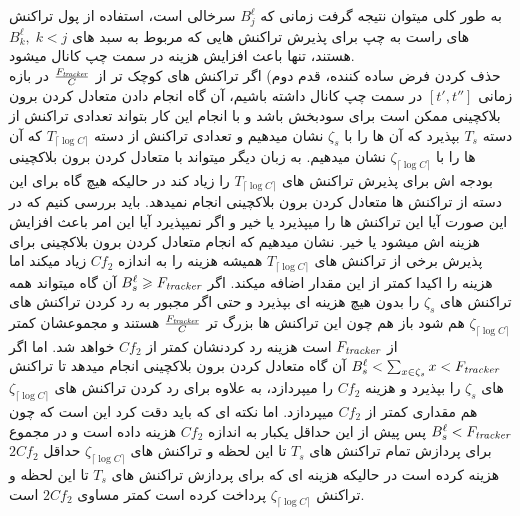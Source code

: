 به طور کلی میتوان نتیجه گرفت زمانی که \bucket
$B_{j}^{\ell}$
سرخالی است، استفاده از پول تراکنش های راست به چپ برای پذیرش تراکنش هایی که مربوط به سبد های
$B_{k}^{\ell}, \;k < j $
هستند، تنها باعث افزایش هزینه \off در سمت چپ کانال میشود. \\
حذف کردن فرض ساده کننده، قدم دوم) اگر تراکنش های کوچک تر از
$\frac{F_{\textit{tracker}}}{C}$
در بازه زمانی
$[t',t'']$
در سمت چپ کانال داشته باشیم، آن گاه انجام دادن متعادل کردن برون بلاکچینی ممکن است برای \off سودبخش باشد و با انجام این کار بتواند تعدادی تراکنش از دسته
$T_s$
بپذیرد که آن ها را با 
$\zeta_{s}$
نشان میدهیم و تعدادی تراکنش از دسته
$T_{\lceil\log{C}\rceil}$
که آن ها را با
$\zeta_{\lceil\log{C}\rceil}$
نشان میدهیم.
به زبان دیگر \off میتواند با متعادل کردن برون بلاکچینی بودجه اش برای پذیرش تراکنش های 
$T_{\lceil\log{C}\rceil}$
را زیاد کند در حالیکه \on هیچ گاه برای این دسته از تراکنش ها متعادل کردن برون بلاکچینی انجام نمیدهد.
باید بررسی کنیم که در این صورت \on آیا این تراکنش ها را میپذیرد یا خیر و اگر نمیپذیرد آیا این امر باعث افزایش هزینه اش میشود یا خیر. نشان میدهیم که انجام متعادل کردن برون بلاکچینی برای پذیرش برخی از تراکنش های 
$T_{\lceil\log{C}\rceil}$
همیشه هزینه \off را  به اندازه
$Cf_2$
زیاد میکند اما هزینه \on را اکیدا کمتر از این مقدار اضافه میکند. اگر
$B_s^{\ell} \geqslant F_{\textit{tracker}}$
آن گاه \on میتواند همه تراکنش های 
$\zeta_{s}$
را بدون هیچ هزینه ای بپذیرد و حتی اگر مجبور به رد کردن تراکنش های 
$\zeta_{\lceil\log{C}\rceil}$
هم شود باز هم چون این تراکنش ها بزرگ تر 
$\frac{F_{\textit{tracker}}}{C}$
هستند و مجموعشان کمتر از
$F_{\textit{tracker}}$
است هزینه رد کردنشان کمتر از
$Cf_2$
خواهد شد.
اما اگر 
$B_s^{\ell} < \sum_{x \in \zeta_{s}} x < F_{\textit{tracker}}$
آن گاه \on متعادل کردن برون بلاکچینی انجام میدهد تا تراکنش های
$\zeta_{s}$
را بپذیرد و هزینه
$Cf_2$
را میپردازد، به علاوه برای رد کردن تراکنش های 
$\zeta_{\lceil\log{C}\rceil}$
هم مقداری کمتر از 
$Cf_2$
میپردازد.
اما نکته ای که باید دقت کرد این است که چون 
$B_s^{\ell} < F_{\textit{tracker}}$
پس پیش از این \off حداقل یکبار به اندازه 
$Cf_2$
هزینه داده است و در مجموع برای پردازش تمام تراکنش های 
$T_s$
تا این لحظه و تراکنش های
$\zeta_{\lceil\log{C}\rceil}$
حداقل 
$2Cf_2$
هزینه کرده است در حالیکه هزینه ای که \on برای پردازش تراکنش های 
$T_s$
تا این لحظه و تراکنش 
$\zeta_{\lceil\log{C}\rceil}$
پرداخت کرده است کمتر مساوی
$2Cf_2$
است.




























